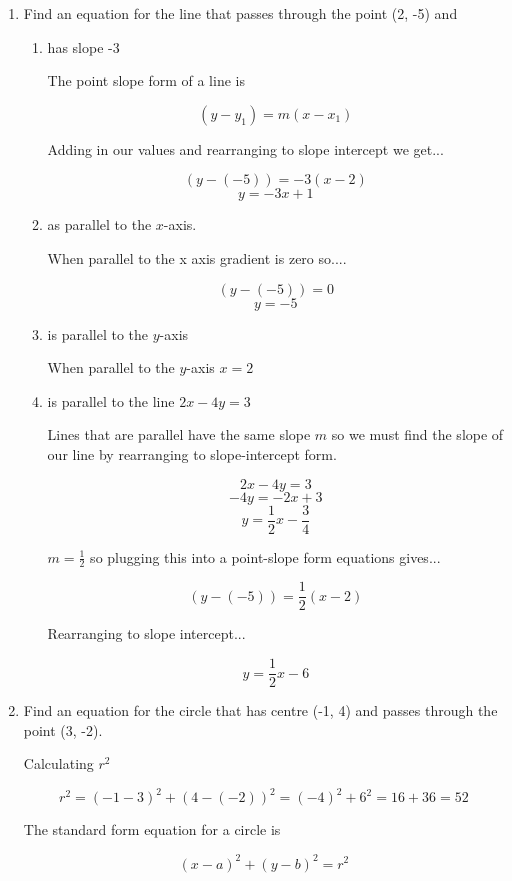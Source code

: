 \documentclass{article}
\begin{document}
\begin{enumerate}

\item Find an equation for the line that passes through the point (2, -5) and

	\begin{enumerate}
		\item has slope -3

		The point slope form of a line is

		$$(y - y_1) = m(x - x_1)$$

		Adding in our values and rearranging to slope intercept we get...

		$$(y - (-5)) = -3(x - 2)$$
		$$y = -3x + 1$$

		\item as parallel to the $x$-axis.

			When parallel to the x axis gradient is zero so....

			$$(y - (-5)) = 0$$
			$$y = -5$$

		\item is parallel to the $y$-axis

			When parallel to the $y$-axis $x = 2$

		\item is parallel to the line $2x - 4y = 3$

			Lines that are parallel have the same slope $m$ so we must find the slope of our line by rearranging to
			slope-intercept form.

			$$2x - 4y = 3$$
			$$-4y = -2x + 3$$
			$$y = \frac{1}{2}x - \frac{3}{4}$$

			$m= \frac{1}{2}$ so plugging this into a point-slope form equations gives...

			$$(y - (-5)) = \frac{1}{2}(x - 2)$$

			Rearranging to slope intercept...

			$$y = \frac{1}{2}x - 6$$

			
	\end{enumerate}

          \item Find an equation for the circle that has centre (-1, 4) and passes through the point (3, -2).

	Calculating $r^2$

	$$r^2 = (-1-3)^2 + (4 - (-2))^2 = (-4)^2 + 6^2 = 16 + 36 = 52$$

	The standard form equation for a circle is

	$$(x-a)^2 + (y-b)^2 = r^2$$


\end{enumerate}
\end{document}
